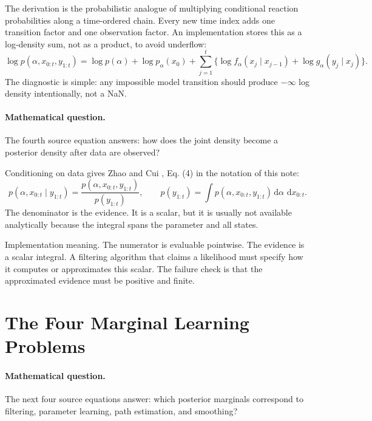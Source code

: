 \documentclass[11pt]{article}
\numberwithin{equation}{section}
\newcommand{\dd}{\,\mathrm d}
\begin{document}
The derivation is the probabilistic analogue of multiplying conditional
reaction probabilities along a time-ordered chain.  Every new time index adds
one transition factor and one observation factor.  An implementation stores
this as a log-density sum, not as a product, to avoid underflow:
\begin{equation}
    \log p(\alpha,x_{0:t},y_{1:t})
    =
    \log p(\alpha)+\log p_\alpha(x_0)
    +
    \sum_{j=1}^t
    \{\log f_\alpha(x_j\mid x_{j-1})+\log g_\alpha(y_j\mid x_j)\}.
    \label{eq:p24-bf-3a}
\end{equation}
The diagnostic is simple: any impossible model transition should produce
\(-\infty\) log density intentionally, not a NaN.

\paragraph{Mathematical question.}
The fourth source equation answers: how does the joint density become a
posterior density after data are observed?

Conditioning on data gives Zhao and Cui \cite{zhao2024ttsequential}, Eq. (4) in the notation of this note:
\begin{equation}
    p(\alpha,x_{0:t}\mid y_{1:t})
    =
    \frac{p(\alpha,x_{0:t},y_{1:t})}
    {p(y_{1:t})},
    \qquad
    p(y_{1:t})
    =
    \int p(\alpha,x_{0:t},y_{1:t})
    \dd\alpha\,\dd x_{0:t}.
    \label{eq:p24-bf-4}
\end{equation}
The denominator is the evidence.  It is a scalar, but it is usually not
available analytically because the integral spans the parameter and all states.

Implementation meaning. The numerator is evaluable pointwise.  The
evidence is a scalar integral.  A filtering algorithm that claims a likelihood
must specify how it computes or approximates this scalar.  The failure check is
that the approximated evidence must be positive and finite.

\section{The Four Marginal Learning Problems}

\paragraph{Mathematical question.}
The next four source equations answer: which posterior marginals correspond to
filtering, parameter learning, path estimation, and smoothing?
\end{document}
